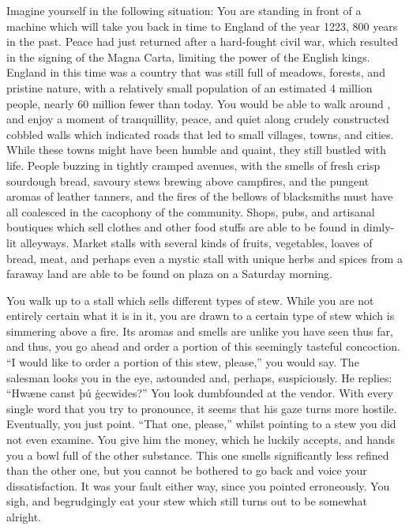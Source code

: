 Imagine yourself in the following situation: You are standing in front of a machine which will take you back in time to England of the year 1223, 800 years in the past. Peace had just returned after a hard-fought civil war, which resulted in the signing of the Magna Carta, limiting the power of the English kings. England in this time was a country that was still full of meadows, forests, and pristine nature, with a relatively small population of an estimated 4 million people, nearly 60 million fewer than today. You would be able to walk around , and enjoy a moment of tranquillity, peace, and quiet along crudely constructed cobbled walls which indicated roads that led to small villages, towns, and cities. While these towns might have been humble and quaint, they still bustled with life. People buzzing in tightly cramped avenues, with the smells of fresh crisp sourdough bread, savoury stews brewing above campfires, and the pungent aromas of leather tanners, and the fires of the bellows of blacksmiths must have all coalesced in the cacophony of the community. Shops, pubs, and artisanal boutiques which sell clothes and other food stuffs are able to be found  in dimly-lit alleyways. Market stalls with several kinds of fruits, vegetables, loaves of bread, meat, and perhaps even a mystic stall with unique herbs and spices from a faraway land are able to be found  on plaza on a Saturday morning. 

You walk up to a stall which sells different types of stew. While you are not entirely certain what it is in it, you are drawn to a certain type of stew which is simmering above a fire. Its aromas and smells are unlike you have seen thus far, and thus, you go ahead and order a portion of this seemingly tasteful concoction. “I would like to order a portion of this stew, please,” you would say. The salesman looks you in the eye, astounded and, perhaps, suspiciously. He replies: “Hwæne canst þú ġecwides?” You look dumbfounded at the vendor. With every single word that you try to pronounce, it seems that his gaze turns more hostile. Eventually, you just point. “That one, please,” whilst pointing to a stew you did not even examine. You give him the money, which he luckily accepts, and hands you a bowl full of the other substance. This one smells significantly less refined than the other one, but you cannot be bothered to go back and voice your dissatisfaction. It was your fault either way, since you pointed erroneously. You sigh, and begrudgingly eat your stew which still turns out to be somewhat alright. 


